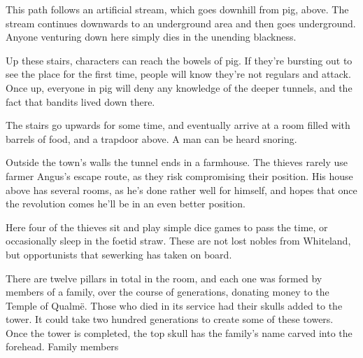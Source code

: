 \begin{multicols}{2}
\label{pigexit}

\label{slidein}

This path follows an artificial stream, which goes downhill from \gls{pig}, above.
The stream continues downwards to an underground area and then goes underground.
Anyone venturing down here simply dies in the unending blackness.



Up these stairs, characters can reach the bowels of \gls{pig}.
If they're bursting out to see the place for the first time, people will know they're not regulars and attack.
Once up, everyone in \gls{pig} will deny any knowledge of the deeper tunnels, and the fact that bandits lived down there.


\begin{boxtext}

	The stairs go upwards for some time, and eventually arrive at a room filled with barrels of food, and a trapdoor above.  A man can be heard snoring.

\end{boxtext}

Outside the town's walls the tunnel ends in a farmhouse.  The thieves rarely use farmer Angus's escape route, as they risk compromising their position.  His house above has several rooms, as he's done rather well for himself, and hopes that once the revolution comes he'll be in an even better position.


Here four of the thieves sit and play simple dice games to pass the time, or occasionally sleep in the foetid straw.
These are not lost nobles from Whiteland, but opportunists that \gls{sewerking} has taken on board.



There are twelve pillars in total in the room, and each one was formed by members of a family, over the course of generations, donating money to the Temple of Qualm\"{e}.  Those who died in its service had their skulls added to the tower.  It could take two hundred generations to create some of these towers.  Once the tower is completed, the top skull has the family's name carved into the forehead.  Family members

\begin{boxtext}


\end{boxtext}
\end{multicols}
